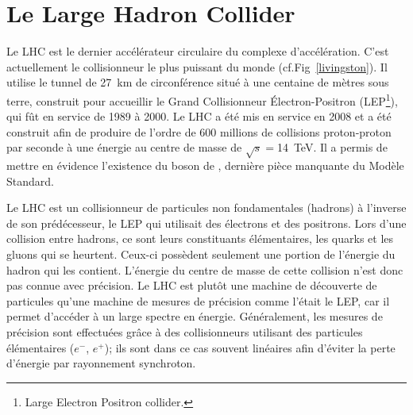 \section{Le Large Hadron Collider}
Le LHC est le dernier accélérateur circulaire du complexe d'accélération. C'est actuellement le collisionneur le plus puissant du monde (cf.Fig~\ref{livingston}). Il utilise le tunnel de \SI{27}{\kilo\meter} de circonférence situé à une centaine de mètres sous terre, construit pour accueillir le Grand Collisionneur Électron-Positron (LEP\footnote{Large Electron Positron collider.}), qui fût en service de \num{1989} à \num{2000}. Le LHC a été mis en service en \num{2008} et a été construit afin de produire de l'ordre de \num{600} millions de collisions proton-proton par seconde à une énergie au centre de masse de $\sqrt{s}=$\SI{14}{\tera\eV}. Il a permis de mettre en évidence l'existence du boson de , dernière pièce manquante du Modèle Standard.

Le LHC est un collisionneur de particules non fondamentales (hadrons) à l'inverse de son prédécesseur, le LEP qui utilisait des électrons et des positrons. Lors d'une collision entre hadrons, ce sont leurs constituants élémentaires, les quarks et les gluons qui se heurtent. Ceux-ci possèdent seulement une portion de l'énergie du hadron qui les contient. L'énergie du centre de masse de cette collision n'est donc pas connue avec précision. Le LHC est plutôt une machine de découverte de particules qu'une machine de mesures de précision comme l'était le LEP, car il permet d'accéder à un large spectre en énergie. Généralement, les mesures de précision sont effectuées grâce à des collisionneurs utilisant des particules élémentaires ($e^{-}$, $e^{+}$); ils sont dans ce cas souvent linéaires afin d'éviter la perte d'énergie par rayonnement synchroton.

